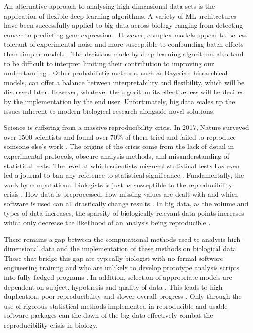 \documentclass[../main.tex]{subfiles}
\begin{document}
An alternative approach to analysing high-dimensional data sets is the application of flexible deep-learning algorithms.
A variety of ML architectures have been successfully applied to big data across biology ranging from detecting cancer to predicting gene expression \parencite{Xie2017, Liang2015, Tang2019}.
However, complex models appear to be less tolerant of experimental noise and more susceptible to confounding batch effects than simpler models \parencite{Cortes2015, Kaiser2019, Schmitt2021}.
The decisions made by deep-learning algorithms also tend to be difficult to interpret limiting their contribution to improving our understanding \parencite{Caruana2015, Ribeiro2016}.
Other probabilistic methods, such as Bayesian hierarchical models, can offer a balance between interpretability and flexibility, which will be discussed later.
However, whatever the algorithm its effectiveness will be decided by the implementation by the end user. 
Unfortunately, big data scales up the issues inherent to modern biological research alongside novel solutions. 

Science is suffering from a massive reproducibility crisis. 
In 2017, Nature surveyed over 1500 scientists and found over 70\% of them tried and failed to reproduce someone else's work \parencite{Baker2016}.
The origins of the crisis come from the lack of detail in experimental protocols, obscure analysis methods, and misunderstanding of statistical tests.
The level at which scientists mis-used statistical tests has even led a journal to ban any reference to statistical significance \parencite{Trafimow2015}.
Fundamentally, the work by computational biologists is just as susceptible to the reproducibility crisis \parencite{Garijo2013}.
How data is preprocessed, how missing values are dealt with and which software is used can all drastically change results \parencite{Ioannidis2009}.
In big data, as the volume and types of data increases, the sparsity of biologically relevant data points increases which only decrease the likelihood of an analysis being reproducible \parencite{Chattopadhyay2019}.

There remains a gap between the computational methods used to analysis high-dimensional data and the implementation of these methods on biological data.
Those that bridge this gap are typically biologist with no formal software engineering training \parencite{Attwood2019} and who are unlikely to develop prototype analysis scripts into fully fledged programs \parencite{Prins2015}. 
In addition, selection of appropriate models are dependent on subject, hypothesis and quality of data \parencite{Ching2018}.
This leads to high duplication, poor reproducibility and slower overall progress \parencite{Lawlor2015}.
Only through the use of rigorous statistical methods implemented in reproducible and usable software packages can the dawn of the big data effectively combat the reproducibility crisis in biology.
\end{document}
